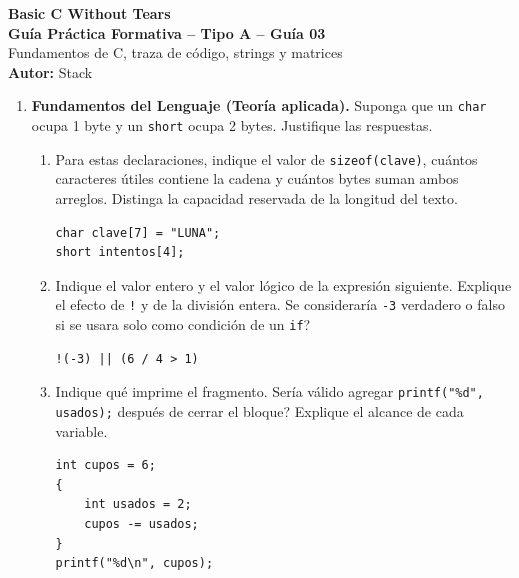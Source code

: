 \documentclass[11pt,letterpaper]{article}
\begin{document}
\begin{center}
    {\LARGE \textbf{Basic C Without Tears}} \\[0.25cm]
    {\Large \textbf{Guía Práctica Formativa -- Tipo A -- Guía 03}} \\[0.15cm]
    \small Fundamentos de C, traza de código, strings y matrices \\[0.1cm]
    \textbf{Autor:} Stack
\end{center}
\vspace{0.3cm}

\begin{enumerate}[label=\textbf{\arabic*.}]
    \item \textbf{Fundamentos del Lenguaje (Teoría aplicada).}
    Suponga que un \texttt{char} ocupa 1 byte y un \texttt{short} ocupa 2 bytes. Justifique las respuestas.
    \begin{enumerate}[label=(\alph*)]
        \item Para estas declaraciones, indique el valor de \texttt{sizeof(clave)}, cuántos caracteres útiles contiene la cadena y cuántos bytes suman ambos arreglos. Distinga la capacidad reservada de la longitud del texto.
        \begin{lstlisting}[style=customc,numbers=none]
char clave[7] = "LUNA";
short intentos[4];
        \end{lstlisting}
        \par\vspace{1.5cm}
        \item Indique el valor entero y el valor lógico de la expresión siguiente. Explique el efecto de \texttt{!} y de la división entera. \textquestiondown{}Se consideraría \texttt{-3} verdadero o falso si se usara solo como condición de un \texttt{if}?
        \begin{lstlisting}[style=customc,numbers=none]
!(-3) || (6 / 4 > 1)
        \end{lstlisting}
        \par\vspace{1.5cm}
        \item Indique qué imprime el fragmento. \textquestiondown{}Sería válido agregar \texttt{printf("\%d", usados);} después de cerrar el bloque? Explique el alcance de cada variable.
        \begin{lstlisting}[style=customc]
int cupos = 6;
{
    int usados = 2;
    cupos -= usados;
}
printf("%d\n", cupos);
        \end{lstlisting}
        \par\vspace{1.5cm}
    \end{enumerate}


\end{enumerate}
\end{document}
